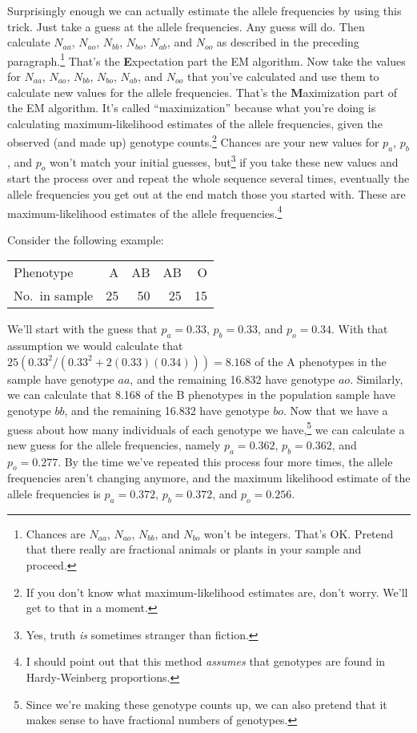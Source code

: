 \documentclass[12pt]{article}
\begin{document}
Surprisingly enough we can actually estimate the allele frequencies by
using this trick. Just take a guess at the allele frequencies. Any
guess will do. Then calculate $N_{aa}$, $N_{ao}$, $N_{bb}$, $N_{bo}$,
$N_{ab}$, and $N_{oo}$ as described in the preceding
paragraph.\footnote{Chances are $N_{aa}$, $N_{ao}$, $N_{bb}$, and
  $N_{bo}$ won't be integers. That's OK. Pretend that there really are
  fractional animals or plants in your sample and proceed.} That's the
{\bf E}xpectation part the EM algorithm. Now take the values for
$N_{aa}$, $N_{ao}$, $N_{bb}$, $N_{bo}$, $N_{ab}$, and $N_{oo}$ that
you've calculated and use them to calculate new values for the allele
frequencies. That's the {\bf M}aximization part of the EM
algorithm. It's called ``maximization'' because what you're doing is
calculating maximum-likelihood estimates of the allele frequencies,
given the observed (and made up) genotype counts.\footnote{If you
  don't know what maximum-likelihood estimates are, don't worry. We'll
  get to that in a moment.} Chances are your new values for $p_a$,
$p_b$, and $p_o$ won't match your initial guesses, but\footnote{Yes,
  truth {\it is\/} sometimes stranger than fiction.}  if you take
these new values and start the process over and repeat the whole
sequence several times, eventually the allele frequencies you get out
at the end match those you started with. These are maximum-likelihood
estimates of the allele frequencies.\footnote{I should point out that
  this method {\it assumes\/} that genotypes are found in
  Hardy-Weinberg proportions.}

Consider the following example:
\begin{center}
\begin{tabular}{l|rrrr}
\hline\hline
Phenotype      & A      & AB      & AB     & O  \\
No.\ in sample & 25     & 50      & 25     & 15 \\
\hline
\end{tabular}
\end{center}
We'll start with the guess that $p_a = 0.33$, $p_b = 0.33$, and
$p_o = 0.34$. With that assumption we would calculate that
$25(0.33^2/(0.33^2 + 2(0.33)(0.34))) = 8.168$ of the A phenotypes in
the sample have genotype $aa$, and the remaining 16.832 have genotype
$ao$. Similarly, we can calculate that 8.168 of the B phenotypes in
the population sample have genotype $bb$, and the remaining 16.832
have genotype $bo$. Now that we have a guess about how many
individuals of each genotype we have,\footnote{Since we're making
  these genotype counts up, we can also pretend that it makes sense to
  have fractional numbers of genotypes.} we can calculate a new guess
for the allele frequencies, namely $p_a = 0.362$, $p_b = 0.362$, and
$p_o = 0.277$. By the time we've repeated this process four more
times, the allele frequencies aren't changing anymore, and the maximum
likelihood estimate of the allele frequencies is $p_a = 0.372$,
$p_b = 0.372$, and $p_o = 0.256$.
\end{document}
